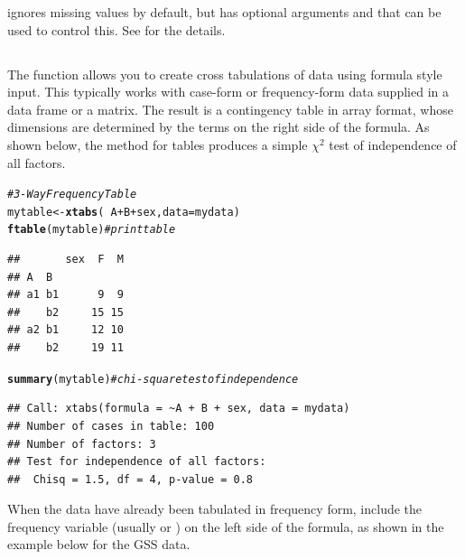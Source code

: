 \documentclass[11pt]{book}\usepackage[]{graphicx}\usepackage[]{color}
\makeatletter
\newcommand{\hlcom}[1]{\textcolor[rgb]{0.678,0.584,0.686}{\textit{#1}}}%
\newcommand{\hlopt}[1]{\textcolor[rgb]{0,0,0}{#1}}%
\newcommand{\hlstd}[1]{\textcolor[rgb]{0.345,0.345,0.345}{#1}}%
\newcommand{\hlkwb}[1]{\textcolor[rgb]{0.69,0.353,0.396}{#1}}%
\newcommand{\hlkwc}[1]{\textcolor[rgb]{0.333,0.667,0.333}{#1}}%
\newcommand{\hlkwd}[1]{\textcolor[rgb]{0.737,0.353,0.396}{\textbf{#1}}}%
\newenvironment{kframe}{%
 \def\at@end@of@kframe{}%
 \ifinner\ifhmode%
  \def\at@end@of@kframe{\end{minipage}}%
  \begin{minipage}{\columnwidth}%
 \fi\fi%
 \def\FrameCommand##1{\hskip\@totalleftmargin \hskip-\fboxsep
 \colorbox{shadecolor}{##1}\hskip-\fboxsep
     \hskip-\linewidth \hskip-\@totalleftmargin \hskip\columnwidth}%
 \MakeFramed {\advance\hsize-\width
   \@totalleftmargin\z@ \linewidth\hsize
   \@setminipage}}%
 {\par\unskip\endMakeFramed%
 \at@end@of@kframe}
\newenvironment{knitrout}{}{} %
\renewenvironment{knitrout}{\small\renewcommand{\baselinestretch}{.85}}{} %
\makeatother
\begin{document}
  ignores missing values by default, but has optional arguments
 and  that can be used to control this.
See  for the details.

\subsection[xtabs()]{}\label{sec:xtabs}

The  function allows you to create cross tabulations of data using formula style input.
This typically works with case-form or frequency-form data
supplied in a data frame or a matrix.
The result is a contingency table in array format, whose dimensions are determined by the terms on the right side of the formula.  As shown below, the  method
for tables produces a simple $\chi^2$ test of independence of all factors.

\begin{knitrout}
\color{fgcolor}\begin{kframe}
\begin{alltt}
\hlcom{# 3-Way Frequency Table}
\hlstd{mytable} \hlkwb{<-} \hlkwd{xtabs}\hlstd{(}\hlopt{~}\hlstd{A}\hlopt{+}\hlstd{B}\hlopt{+}\hlstd{sex,} \hlkwc{data}\hlstd{=mydata)}
\hlkwd{ftable}\hlstd{(mytable)}    \hlcom{# print table}
\end{alltt}
\begin{verbatim}
##       sex  F  M
## A  B           
## a1 b1      9  9
##    b2     15 15
## a2 b1     12 10
##    b2     19 11
\end{verbatim}
\begin{alltt}
\hlkwd{summary}\hlstd{(mytable)}   \hlcom{# chi-square test of independence}
\end{alltt}
\begin{verbatim}
## Call: xtabs(formula = ~A + B + sex, data = mydata)
## Number of cases in table: 100 
## Number of factors: 3 
## Test for independence of all factors:
## 	Chisq = 1.5, df = 4, p-value = 0.8
\end{verbatim}
\end{kframe}
\end{knitrout}


When the data have already been tabulated in frequency form, include the
frequency variable (usually  or )
on the left side of the formula, as shown in the example below for the GSS data.
\end{document}
